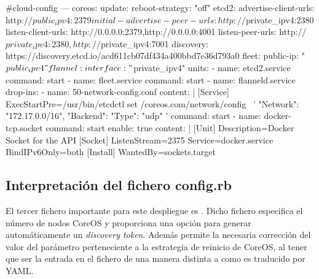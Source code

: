 \begin{codelisting}
\label{code:cloud-config1}
\begin{code}
#cloud-config
---
coreos:
  update:
    reboot-strategy: "off"
  etcd2:
    advertise-client-urls: http://$public_ipv4:2379
    initial-advertise-peer-urls: http://$private_ipv4:2380
    listen-client-urls: http://0.0.0.0:2379,http://0.0.0.0:4001
    listen-peer-urls: http://$private_ipv4:2380,http://$private_ipv4:7001
    discovery: https://discovery.etcd.io/acd611cb07df434a400bbd7e36d793a0
  fleet:
    public-ip: "$public_ipv4"
  flannel:
    interface: "$private_ipv4"
  units:
  - name: etcd2.service
    command: start
  - name: fleet.service
    command: start
  - name: flanneld.service
    drop-ins:
    - name: 50-network-config.conf
      content: |
        [Service]
        ExecStartPre=/usr/bin/etcdctl set /coreos.com/network/config \
        '{ "Network": "172.17.0.0/16", "Backend": { "Type": "udp" } }'
    command: start
  - name: docker-tcp.socket
    command: start
    enable: true
    content: |
      [Unit]
      Description=Docker Socket for the API
      [Socket]
      ListenStream=2375
      Service=docker.service
      BindIPv6Only=both
      [Install]
      WantedBy=sockets.target
\end{code}
\end{codelisting}

\subsection{Interpretación del fichero config.rb}

El tercer fichero importante para este despliegue es . Dicho fichero especifica el número de nodos CoreOS y proporciona una opción para generar automáticamente un \textit{discovery token}. Además permite la necesaria corrección del valor del parámetro perteneciente a la estrategia de reinicio de CoreOS, al tener que ser la entrada en el fichero  de una manera distinta a como es traducido por YAML.

